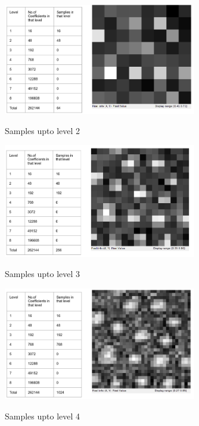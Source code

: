 \documentclass{article}
\begin{document}
\begin{figure}[ht]
 \centering  
 \includegraphics[width=0.75\textwidth]{Figures/upto_level2.png}
 \label{fig:1}
 \caption{Samples upto level 2}
\end{figure}


\begin{figure}[ht]
 \centering  
 \includegraphics[width=0.75\textwidth]{Figures/upto_level3.png}
 \label{fig:1}
 \caption{Samples upto level 3}
\end{figure}

\begin{figure}[ht]
 \centering  
 \includegraphics[width=0.75\textwidth]{Figures/upto_level4.png}
 \label{fig:1}
 \caption{Samples upto level 4}
\end{figure}
\end{document}
